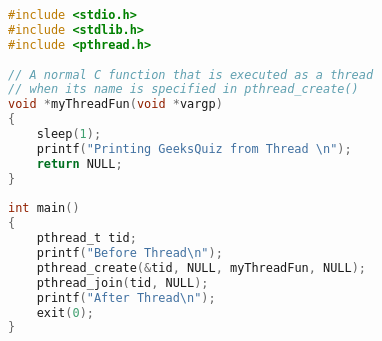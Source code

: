 \begin{table}[ht]
\centering
\caption{Processes versus Threads}
\end{table}


\begin{lstlisting}[language=c]
#include <stdio.h>
#include <stdlib.h>
#include <pthread.h>
 
// A normal C function that is executed as a thread 
// when its name is specified in pthread_create()
void *myThreadFun(void *vargp)
{
    sleep(1);
    printf("Printing GeeksQuiz from Thread \n");
    return NULL;
}
  
int main()
{
    pthread_t tid;
    printf("Before Thread\n");
    pthread_create(&tid, NULL, myThreadFun, NULL);
    pthread_join(tid, NULL);
    printf("After Thread\n");
    exit(0);
}
\end{lstlisting}


